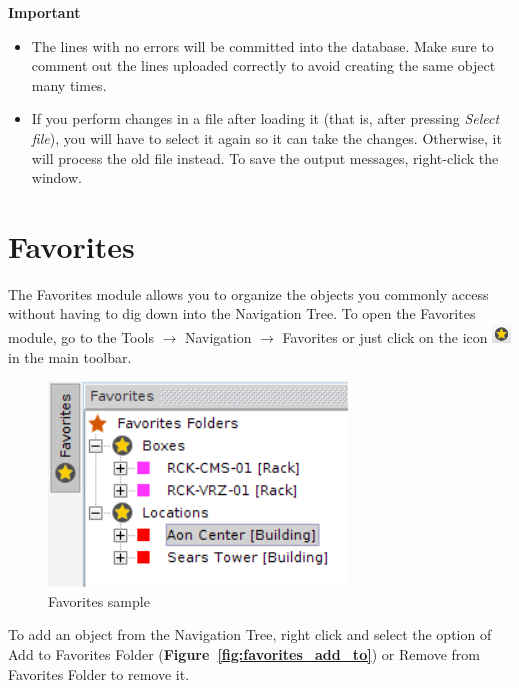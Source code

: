 \documentclass[a4paper]{article}
\begin{document}
				\newpage
				\begin{framed} {\large \textbf{Important}}
					\begin{itemize}
					\item The lines with no errors will be committed into the database. Make sure to comment out the lines uploaded correctly to avoid creating the same object many times.
					
					\item If you perform changes in a file after loading it (that is, after pressing \textit{Select file}), you will have to select it again so it can take the changes. Otherwise, it will process the old file instead. To save the output messages, right-click the window.
					\end{itemize}
				\end{framed}
		
		\clearpage
		\section{Favorites}\label{sec:favorites}
		
			The Favorites module allows you to organize the objects you commonly access without having to dig down into the Navigation Tree. To open the Favorites module, go to the Tools $\rightarrow$ Navigation $\rightarrow$ Favorites or just click on the icon
			\includegraphics[width=0.5cm]{img/icon_bookmarks.png} in the main toolbar.
			
			\begin{figure}[h!]
				\centering
				\includegraphics[width=0.4\linewidth]{img/favorites_explorer.png}
				\caption{Favorites sample}
				\label{fig:bookmakrs}
			\end{figure}
			
			To add an object from the Navigation Tree, right click and select the option of Add to Favorites Folder (\textbf{Figure~\ref{fig:favorites_add_to}}) or Remove from Favorites Folder to remove it.
						
\end{document}
